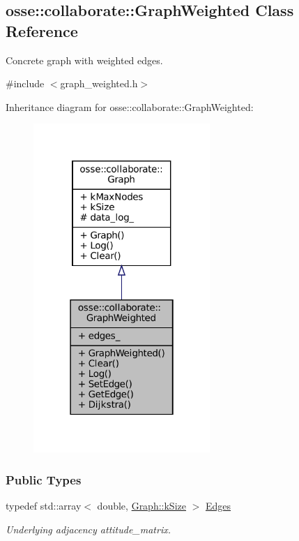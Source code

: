 \hypertarget{classosse_1_1collaborate_1_1_graph_weighted}{}\subsection{osse\+:\+:collaborate\+:\+:Graph\+Weighted Class Reference}
\label{classosse_1_1collaborate_1_1_graph_weighted}


Concrete graph with weighted edges.  




{\ttfamily \#include $<$graph\+\_\+weighted.\+h$>$}



Inheritance diagram for osse\+:\+:collaborate\+:\+:Graph\+Weighted\+:
\nopagebreak
\begin{figure}[H]
\begin{center}
\leavevmode
\includegraphics[width=190pt]{classosse_1_1collaborate_1_1_graph_weighted__inherit__graph}
\end{center}
\end{figure}
\subsubsection*{Public Types}
\begin{DoxyCompactItemize}
\item 
\mbox{\label{classosse_1_1collaborate_1_1_graph_weighted_aa604a648e701d85c8deb818f13b64097}} 
typedef std\+::array$<$ double, \hyperlink{classosse_1_1collaborate_1_1_graph_a9c9828305d419d29fc1eed87a4520cd5}{Graph\+::k\+Size} $>$ \hyperlink{classosse_1_1collaborate_1_1_graph_weighted_aa604a648e701d85c8deb818f13b64097}{Edges}
\begin{DoxyCompactList}\small\item\em Underlying adjacency attitude\+\_\+matrix. \end{DoxyCompactList}\end{DoxyCompactItemize}
